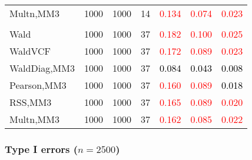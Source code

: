 \documentclass[
]{article}
\begin{document}
\begin{table}[H]
{\begin{tabular}[t]{lrrrrrr}
\hspace{1em}Multn,MM3 & 1000 & 1000 & 14 & \textcolor{red}{0.134} & \textcolor{red}{0.074} & \textcolor{red}{0.023}\\
\addlinespace[0.3em]
\multicolumn{7}{l}{\textbf{3F 15V}}\\
\hspace{1em}Wald & 1000 & 1000 & 37 & \textcolor{red}{0.182} & \textcolor{red}{0.100} & \textcolor{red}{0.025}\\
\hspace{1em}WaldVCF & 1000 & 1000 & 37 & \textcolor{red}{0.172} & \textcolor{red}{0.089} & \textcolor{red}{0.023}\\
\hspace{1em}WaldDiag,MM3 & 1000 & 1000 & 37 & \textcolor{black}{0.084} & \textcolor{black}{0.043} & \textcolor{black}{0.008}\\
\hspace{1em}Pearson,MM3 & 1000 & 1000 & 37 & \textcolor{red}{0.160} & \textcolor{red}{0.089} & \textcolor{black}{0.018}\\
\hspace{1em}RSS,MM3 & 1000 & 1000 & 37 & \textcolor{red}{0.165} & \textcolor{red}{0.089} & \textcolor{red}{0.020}\\
\hspace{1em}Multn,MM3 & 1000 & 1000 & 37 & \textcolor{red}{0.162} & \textcolor{red}{0.085} & \textcolor{red}{0.022}\\
\bottomrule
\end{tabular}}
\endgroup{}
\end{table}

\hypertarget{type-i-errors-n2500-3}{%
\subsubsection{\texorpdfstring{Type I errors
(\(n=2500\))}{Type I errors (n=2500)}}\label{type-i-errors-n2500-3}}
\end{document}
